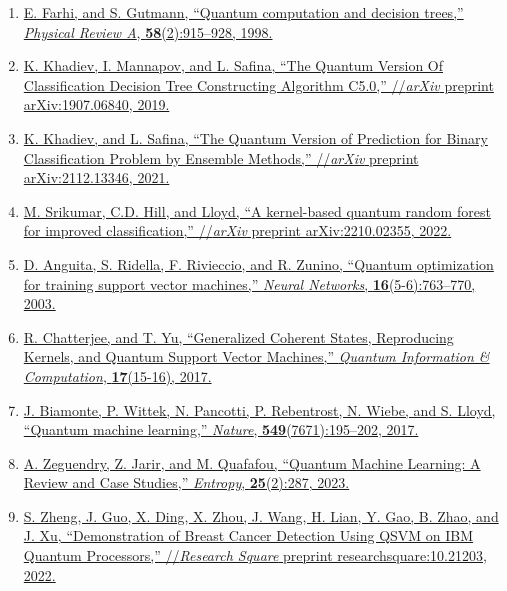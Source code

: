 \documentclass[11pt, oneside]{article}   	%
\begin{document}
\begin{enumerate}
    \item \href{https://journals.aps.org/pra/abstract/10.1103/PhysRevA.58.915}{E. Farhi, and S. Gutmann, ``Quantum computation and decision trees,” \textit{Physical Review A}, \textbf{58}(2):915–928, 1998.}
    
    \item \href{https://arxiv.org/abs/1907.06840}{K. Khadiev, I. Mannapov, and L. Safina, ``The Quantum Version Of Classification Decision Tree Constructing Algorithm C5.0,” //\textit{arXiv} preprint arXiv:1907.06840, 2019.}
   
   \item \href{https://arxiv.org/abs/2112.13346}{K. Khadiev, and L. Safina, ``The Quantum Version of Prediction for Binary Classification Problem by Ensemble Methods,” //\textit{arXiv} preprint arXiv:2112.13346, 2021.}
   
   \item \href{https://arxiv.org/abs/2210.02355}{M. Srikumar, C.D. Hill, and Lloyd, ``A kernel-based quantum random forest for improved classification,” //\textit{arXiv} preprint arXiv:2210.02355, 2022.}
   
   \item \href{https://doi.org/10.1016/S0893-6080(03)00087-X}{D. Anguita, S. Ridella, F. Rivieccio, and R. Zunino, ``Quantum optimization for training support vector machines,” \textit{Neural Networks}, \textbf{16}(5-6):763–770, 2003.}
   
   \item \href{https://doi.org/10.26421/QIC17.15-16}{R. Chatterjee, and T. Yu, ``Generalized Coherent States, Reproducing Kernels, and Quantum Support Vector Machines,” \textit{Quantum Information \& Computation}, \textbf{17}(15-16), 2017.}
   
   \item \href{https://doi.org/10.1038/nature23474}{J. Biamonte, P. Wittek, N. Pancotti, P. Rebentrost, N. Wiebe, and S. Lloyd, ``Quantum machine learning,” \textit{Nature}, \textbf{549}(7671):195–202, 2017.}
   
   \item \href{https://doi.org/10.3390/e25020287}{A. Zeguendry, Z. Jarir, and M. Quafafou, ``Quantum Machine Learning: A Review and Case Studies,” \textit{Entropy}, \textbf{25}(2):287, 2023.}
   
   \item \href{https://doi.org/10.21203/rs.3.rs-1434074/v1}{S. Zheng, J. Guo, X. Ding, X. Zhou, J. Wang, H. Lian, Y. Gao, B. Zhao, and J. Xu, “Demonstration of Breast Cancer Detection Using QSVM on IBM Quantum Processors,” //\textit{Research Square} preprint researchsquare:10.21203, 2022.}
   

\end{enumerate}
\end{document}
